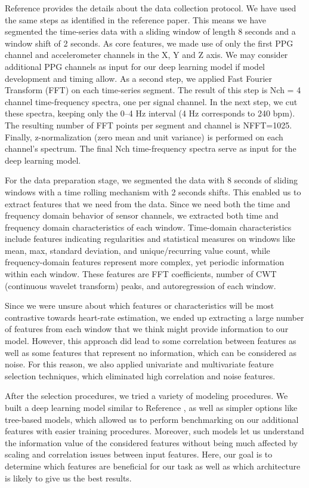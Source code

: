 \documentclass[12pt, conference]{IEEEtran}
\begin{document}
Reference \cite{reiss2019deep} provides the details about the data collection protocol. We have used the same steps as identified in the reference paper. This means we have segmented the time-series data with a sliding window of length 8 seconds and a window shift of 2 seconds. As core features, we made use of only the first PPG channel and accelerometer channels in the X, Y and Z axis. We may consider additional PPG channels as input for our deep learning model if model development and timing allow. As a second step, we applied Fast Fourier Transform (FFT) on each time-series segment. The result of this step is Nch = 4 channel time-frequency spectra, one per signal channel. In the next step, we cut these spectra, keeping only the 0–4 Hz interval (4 Hz corresponds to 240 bpm). The resulting number of FFT points per segment and channel is NFFT=1025. Finally, z-normalization (zero mean and unit variance) is performed on each channel’s spectrum. The final Nch time-frequency spectra serve as input for the deep learning model.

For the data preparation stage, we segmented the data with 8 seconds of sliding windows with a time rolling mechanism with 2 seconds shifts. This enabled us to extract features that we need from the data. Since we need both the time and frequency domain behavior of sensor channels, we extracted both time and frequency domain characteristics of each window. Time-domain characteristics include features indicating regularities and statistical measures on windows like mean, max, standard deviation, and unique/recurring value count, while frequency-domain features represent more complex, yet periodic information within each window. These features are FFT coefficients, number of CWT (continuous wavelet transform) peaks, and autoregression of each window. 

Since we were unsure about which features or characteristics will be most contrastive towards heart-rate estimation, we ended up extracting a large number of features from each window that we think might provide information to our model. However, this approach did lead to some correlation between features as well as some features that represent no information, which can be considered as noise. For this reason, we also applied univariate and multivariate feature selection techniques, which eliminated high correlation and noise features. 

After the selection procedures, we tried a variety of modeling procedures. We built a deep learning model similar to Reference \cite{reiss2019deep}, as well as simpler options like tree-based models, which allowed us to perform benchmarking on our additional features with easier training procedures. Moreover, such models let us understand the information value of the considered features without being much affected by scaling and correlation issues between input features. Here, our goal is to determine which features are beneficial for our task as well as which architecture is likely to give us the best results.
    
\end{document}
